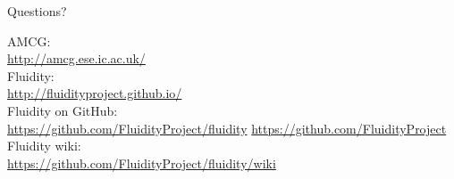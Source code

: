 \documentclass[t]{beamer}
\begin{document}
\begin{frame}{Questions?}
\begin{center}
\vfill
AMCG:\\
\url{http://amcg.ese.ic.ac.uk/}\\[15pt]
Fluidity:\\
\url{http://fluidityproject.github.io/}\\[15pt]
Fluidity on GitHub:\\
\url{https://github.com/FluidityProject/fluidity}
\url{https://github.com/FluidityProject}\\[15pt]
Fluidity wiki:\\
\url{https://github.com/FluidityProject/fluidity/wiki}
\end{center}
\end{frame}
\end{document}
